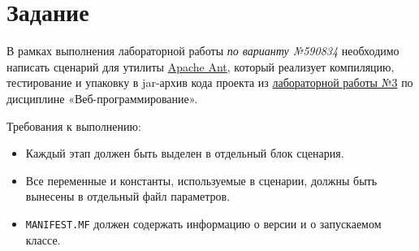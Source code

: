 \section{Задание}

В рамках выполнения лабораторной работы \textit{по варианту №590834} необходимо написать сценарий для утилиты \href{https://ant.apache.org/}{Apache Ant}, который реализует компиляцию, тестирование и упаковку в jar-архив кода проекта из \href{https://github.com/aaalvaaas/web3}{лабораторной работы №3} по дисциплине «Веб-программирование».

Требования к выполнению:
\begin{itemize}
  \item Каждый этап должен быть выделен в отдельный блок сценария.
  \item Все переменные и константы, используемые в сценарии, должны быть вынесены в отдельный файл параметров.
  \item \texttt{MANIFEST.MF} должен содержать информацию о версии и о запускаемом классе.
\end{itemize}

